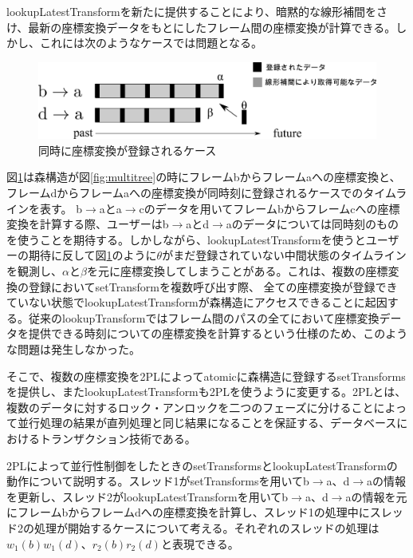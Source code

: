 \documentclass[a4paper]{jreport}	%
\begin{document}
lookupLatestTransformを新たに提供することにより、暗黙的な線形補間をさけ、最新の座標変換データをもとにしたフレーム間の座標変換が計算できる。しかし、これには次のようなケースでは問題となる。

\begin{figure}[h] 
\centering
\includegraphics[width=12cm]{coming-same-time}
\caption{同時に座標変換が登録されるケース}
\label{fig:coming-same-time}
\end{figure}


図\ref{fig:coming-same-time}は森構造が図\ref{fig:multitree}の時にフレームbからフレームaへの座標変換と、フレームdからフレームaへの座標変換が同時刻に登録されるケースでのタイムラインを表す。
b$\rightarrow$aとa$\rightarrow$cのデータを用いてフレームbからフレームcへの座標変換を計算する際、ユーザーはb$\rightarrow$aとd$\rightarrow$aのデータについては同時刻のものを使うことを期待する。しかしながら、lookupLatestTransformを使うとユーザーの期待に反して図\ref{fig:coming-same-time}のように$\theta$がまだ登録されていない中間状態のタイムラインを観測し、$\alpha$と$\beta$を元に座標変換してしまうことがある。これは、複数の座標変換の登録においてsetTransformを複数呼び出す際、 全ての座標変換が登録できていない状態でlookupLatestTransformが森構造にアクセスできることに起因する。従来のlookupTransformではフレーム間のパスの全てにおいて座標変換データを提供できる時刻についての座標変換を計算するという仕様のため、このような問題は発生しなかった。


そこで、複数の座標変換を2PLによってatomicに森構造に登録するsetTransformsを提供し、またlookupLatestTransformも2PLを使うように変更する。2PL\cite{2PL}とは、複数のデータに対するロック・アンロックを二つのフェーズに分けることによって並行処理の結果が直列処理と同じ結果になることを保証する、データベースにおけるトランザクション技術である。

2PLによって並行性制御をしたときのsetTransformsとlookupLatestTransformの動作について説明する。スレッド1がsetTransformsを用いてb$\rightarrow$a、d$\rightarrow$aの情報を更新し、スレッド2がlookupLatestTransformを用いてb$\rightarrow$a、d$\rightarrow$aの情報を元にフレームbからフレームdへの座標変換を計算し、スレッド1の処理中にスレッド2の処理が開始するケースについて考える。それぞれのスレッドの処理は$w_1(b)w_1(d)$、$r_2(b)r_2(d)$と表現できる。
\end{document}
